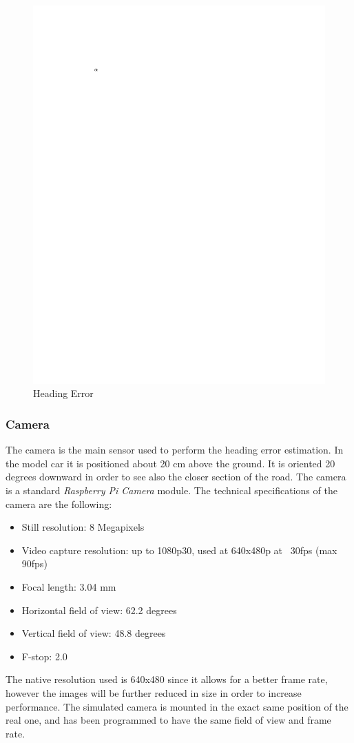 \documentclass[a4paper,12pt,sort&compress]{article}
\begin{document}
    \begin{figure}
        \centering
        \includegraphics[width=0.8\linewidth]{a.pdf}
        \caption{Heading Error}
        \label{fig:heading_error}
    \end{figure}

    \subsubsection{Camera}
    The camera is the main sensor used to perform the heading error estimation.
    In the model car it is positioned about 20 cm above the ground. It is oriented 20 degrees downward in order to see also the closer
    section of the road. The camera is a standard \textit{Raspberry Pi Camera}
    module. The technical specifications of the camera are the following:
    \begin{itemize}
        \item Still resolution: 8 Megapixels
        \item Video capture resolution: up to 1080p30, used at 640x480p at
        ~30fps (max 90fps)
        \item Focal length: 3.04 mm
        \item Horizontal field of view: 62.2 degrees
        \item Vertical field of view: 48.8 degrees
        \item F-stop: 2.0
    \end{itemize}
    The native resolution used is 640x480 since it allows for a better
    frame rate, however the images will be further reduced in size in order to
    increase performance. The simulated camera is mounted in the exact same
    position of the real one, and has been programmed to have the same field of
    view and frame rate.  
\end{document}
